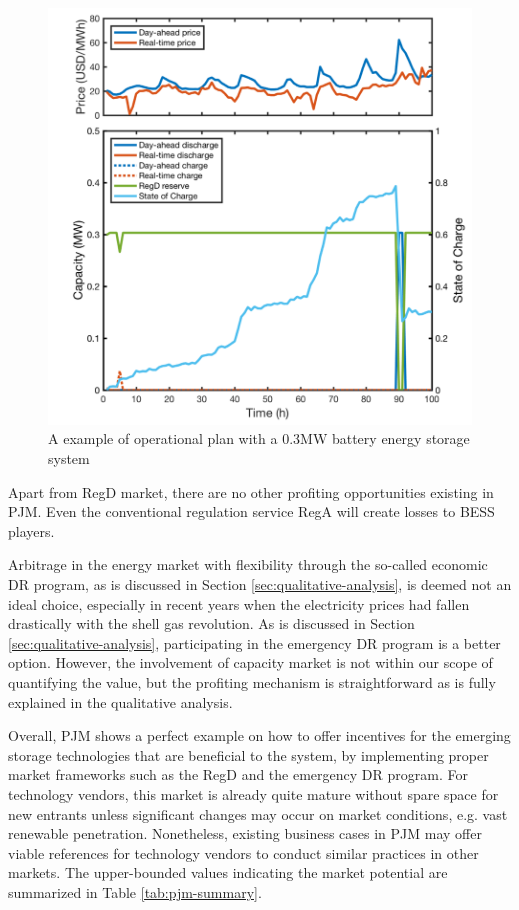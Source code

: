 \begin{figure}[h!]
	\centering
	\includegraphics[width=0.9\linewidth]{Figures/PJM_multitasking_example}
	\caption{A example of operational plan with a 0.3MW battery energy storage system}
	\label{fig:pjm-multitasking}
\end{figure}

Apart from RegD market, there are no other profiting opportunities existing in PJM. Even the conventional regulation service RegA will create losses to BESS players.

Arbitrage in the energy market with flexibility through the so-called economic DR program, as is discussed in Section \ref{sec:qualitative-analysis}, is deemed not an ideal choice, especially in recent years when the electricity prices had fallen drastically with the shell gas revolution. As is discussed in Section \ref{sec:qualitative-analysis}, participating in the emergency DR program is a better option. However, the involvement of capacity market is not within our scope of quantifying the value, but the profiting mechanism is straightforward as is fully explained in the qualitative analysis. %

Overall, PJM shows a perfect example on how to offer incentives for the emerging storage technologies that are beneficial to the system, by implementing proper market frameworks such as the RegD and the  emergency DR program. For technology vendors, this market is already quite mature without spare space for new entrants unless significant changes may occur on market conditions, e.g. vast renewable penetration. Nonetheless, existing business cases in PJM may offer viable references for technology vendors to conduct similar practices in other markets. 
The upper-bounded values indicating the market potential are summarized in Table \ref{tab:pjm-summary}.



